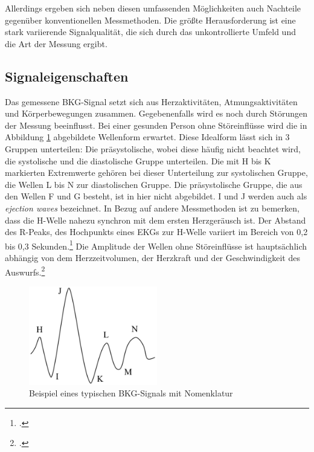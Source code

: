 	Allerdings ergeben sich neben diesen umfassenden Möglichkeiten auch Nachteile gegenüber konventionellen Messmethoden. Die größte Herausforderung ist eine stark variierende Signalqualität, die sich durch das unkontrollierte Umfeld und die Art der Messung ergibt.

	\subsection{Signaleigenschaften}
	
	Das gemessene \ac{BKG}-Signal setzt sich aus Herzaktivitäten, Atmungsaktivitäten und Körperbewegungen zusammen. Gegebenenfalls wird es noch durch Störungen der Messung beeinflusst. Bei einer gesunden Person ohne Störeinflüsse wird die in Abbildung \ref{fig:bcgwaveform} abgebildete Wellenform erwartet. Diese Idealform lässt sich in 3 Gruppen unterteilen: Die präsystolische, wobei diese häufig nicht beachtet wird, die systolische und die diastolische Gruppe unterteilen. Die mit H bis K markierten Extremwerte gehören bei dieser Unterteilung zur systolischen Gruppe, die Wellen L bis N zur diastolischen Gruppe. Die präsystolische Gruppe, die aus den Wellen F und G besteht, ist in hier nicht abgebildet. I und J werden auch als \textit{ejection waves} bezeichnet. In Bezug auf andere Messmethoden ist zu bemerken, dass die H-Welle nahezu synchron mit dem ersten Herzgeräusch ist. Der Abstand des R-Peaks, des Hochpunkts eines \ac{EKG}s zur H-Welle variiert im Bereich von 0,2 bis 0,3 Sekunden.\footcite[Vgl.][]{DELALLA1950} Die Amplitude der Wellen ohne Störeinflüsse ist hauptsächlich abhängig von dem Herzzeitvolumen, der Herzkraft und der Geschwindigkeit des Auswurfs.\footcite[Vgl.][]{Pinheiro2010}
	
	\begin{figure}[H]
		\centering
		\includegraphics[width=0.5\textwidth]{pic/bcgWaveform.png}
		\caption[Beispiel eines typischen \ac{BKG}-Signals mit Nomenklatur]{Beispiel eines typischen \ac{BKG}-Signals mit Nomenklatur\protect\footnotemark}
		\label{fig:bcgwaveform}
	\end{figure}
	
